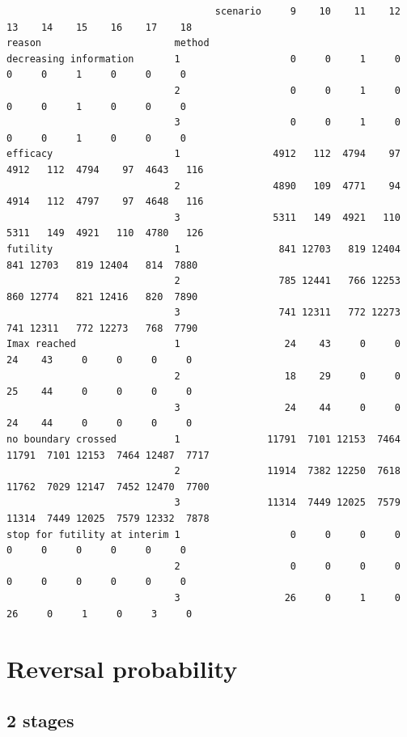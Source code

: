 \documentclass[12pt]{article}
\begin{document}
\begin{verbatim}
                                    scenario     9    10    11    12    13    14    15    16    17    18
reason                       method                                                                     
decreasing information       1                   0     0     1     0     0     0     1     0     0     0
                             2                   0     0     1     0     0     0     1     0     0     0
                             3                   0     0     1     0     0     0     1     0     0     0
efficacy                     1                4912   112  4794    97  4912   112  4794    97  4643   116
                             2                4890   109  4771    94  4914   112  4797    97  4648   116
                             3                5311   149  4921   110  5311   149  4921   110  4780   126
futility                     1                 841 12703   819 12404   841 12703   819 12404   814  7880
                             2                 785 12441   766 12253   860 12774   821 12416   820  7890
                             3                 741 12311   772 12273   741 12311   772 12273   768  7790
Imax reached                 1                  24    43     0     0    24    43     0     0     0     0
                             2                  18    29     0     0    25    44     0     0     0     0
                             3                  24    44     0     0    24    44     0     0     0     0
no boundary crossed          1               11791  7101 12153  7464 11791  7101 12153  7464 12487  7717
                             2               11914  7382 12250  7618 11762  7029 12147  7452 12470  7700
                             3               11314  7449 12025  7579 11314  7449 12025  7579 12332  7878
stop for futility at interim 1                   0     0     0     0     0     0     0     0     0     0
                             2                   0     0     0     0     0     0     0     0     0     0
                             3                  26     0     1     0    26     0     1     0     3     0
\end{verbatim}

\clearpage

\section{Reversal probability}
\label{sec:orgf2e6d75}

\subsection{2 stages}
\label{sec:org52b2d2e}
\end{document}
